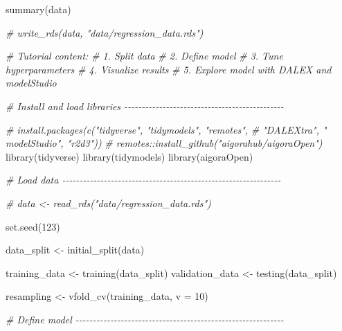 \documentclass[
]{book}
\newenvironment{Shaded}{\begin{snugshade}}{\end{snugshade}}
\newcommand{\AttributeTok}[1]{\textcolor[rgb]{0.77,0.63,0.00}{#1}}
\newcommand{\CommentTok}[1]{\textcolor[rgb]{0.56,0.35,0.01}{\textit{#1}}}
\newcommand{\DecValTok}[1]{\textcolor[rgb]{0.00,0.00,0.81}{#1}}
\newcommand{\FunctionTok}[1]{\textcolor[rgb]{0.00,0.00,0.00}{#1}}
\newcommand{\NormalTok}[1]{#1}
\newcommand{\OtherTok}[1]{\textcolor[rgb]{0.56,0.35,0.01}{#1}}
\begin{document}
\begin{Shaded}
\begin{Highlighting}[]
\FunctionTok{summary}\NormalTok{(data)}

\CommentTok{\# write\_rds(data, "data/regression\_data.rds")}
\end{Highlighting}
\end{Shaded}

\begin{Shaded}
\begin{Highlighting}[]
\CommentTok{\# Tutorial content:}
\CommentTok{\#   1. Split data}
\CommentTok{\#   2. Define model}
\CommentTok{\#   3. Tune hyperparameters}
\CommentTok{\#   4. Visualize results}
\CommentTok{\#   5. Explore model with DALEX and modelStudio}


\CommentTok{\# Install and load libraries {-}{-}{-}{-}{-}{-}{-}{-}{-}{-}{-}{-}{-}{-}{-}{-}{-}{-}{-}{-}{-}{-}{-}{-}{-}{-}{-}{-}{-}{-}{-}{-}{-}{-}{-}{-}{-}{-}{-}{-}{-}{-}{-}{-}{-}{-}}

\CommentTok{\# install.packages(c("tidyverse", "tidymodels", "remotes",}
\CommentTok{\#                    "DALEXtra", " modelStudio", "r2d3"))}
\CommentTok{\# remotes::install\_github("aigorahub/aigoraOpen")}
\FunctionTok{library}\NormalTok{(tidyverse)}
\FunctionTok{library}\NormalTok{(tidymodels)}
\FunctionTok{library}\NormalTok{(aigoraOpen)}


\CommentTok{\# Load data {-}{-}{-}{-}{-}{-}{-}{-}{-}{-}{-}{-}{-}{-}{-}{-}{-}{-}{-}{-}{-}{-}{-}{-}{-}{-}{-}{-}{-}{-}{-}{-}{-}{-}{-}{-}{-}{-}{-}{-}{-}{-}{-}{-}{-}{-}{-}{-}{-}{-}{-}{-}{-}{-}{-}{-}{-}{-}{-}{-}{-}{-}{-}}

\CommentTok{\# data \textless{}{-} read\_rds("data/regression\_data.rds")}

\FunctionTok{set.seed}\NormalTok{(}\DecValTok{123}\NormalTok{)}

\NormalTok{data\_split }\OtherTok{\textless{}{-}} \FunctionTok{initial\_split}\NormalTok{(data)}

\NormalTok{training\_data }\OtherTok{\textless{}{-}} \FunctionTok{training}\NormalTok{(data\_split)}
\NormalTok{validation\_data }\OtherTok{\textless{}{-}} \FunctionTok{testing}\NormalTok{(data\_split)}

\NormalTok{resampling }\OtherTok{\textless{}{-}} \FunctionTok{vfold\_cv}\NormalTok{(training\_data, }\AttributeTok{v =} \DecValTok{10}\NormalTok{)}

\CommentTok{\# Define model {-}{-}{-}{-}{-}{-}{-}{-}{-}{-}{-}{-}{-}{-}{-}{-}{-}{-}{-}{-}{-}{-}{-}{-}{-}{-}{-}{-}{-}{-}{-}{-}{-}{-}{-}{-}{-}{-}{-}{-}{-}{-}{-}{-}{-}{-}{-}{-}{-}{-}{-}{-}{-}{-}{-}{-}{-}{-}{-}{-}}


\end{Highlighting}
\end{Shaded}
\end{document}
